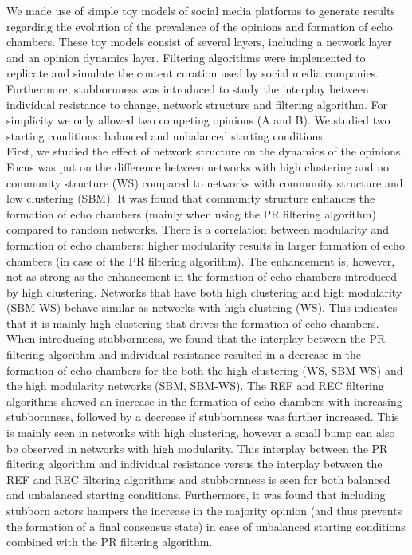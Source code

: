 \documentclass[11 pt , letterpaper , twoside , openright]{book}
\begin{document}
We made use of simple toy models of social media platforms to generate results regarding the evolution of the prevalence of the opinions and formation of echo chambers. These toy models consist of several layers, including a network layer and an opinion dynamics layer. Filtering algorithms were implemented to replicate and simulate the content curation used by social media companies. Furthermore, stubbornness was introduced to study the interplay between individual resistance to change, network structure and filtering algorithm. For simplicity we only allowed two competing opinions (A and B). We studied two starting conditions: balanced and unbalanced starting conditions.\\
\newline
First, we studied the effect of network structure on the dynamics of the opinions. Focus was put on the difference between networks with high clustering and no community structure (WS) compared to networks with community structure and low clustering (SBM). It was found that community structure enhances the formation of echo chambers (mainly when using the PR filtering algorithm) compared to random networks. There is a correlation between modularity and formation of echo chambers: higher modularity results in larger formation of echo chambers (in case of the PR filtering algorithm). The enhancement is, however, not as strong as the enhancement in the formation of echo chambers introduced by high clustering. Networks that have both high clustering and high modularity (SBM-WS) behave similar as networks with high clusteing (WS). This indicates that it is mainly high clustering that drives the formation of echo chambers.\\
\newline
When introducing stubbornness, we found that the interplay between the PR filtering algorithm and individual resistance resulted in a decrease in the formation of echo chambers for the both the high clustering (WS, SBM-WS) and the high modularity networks (SBM, SBM-WS). The REF and REC filtering algorithms showed an increase in the formation of echo chambers with increasing stubbornness, followed by a decrease if stubbornness was further increased. This is mainly seen in networks with high clustering, however a small bump can also be observed in networks with high modularity. This interplay between the PR filtering algorithm and individual resistance versus the interplay between the REF and REC filtering algorithms and stubbornness is seen for both balanced and unbalanced starting conditions. Furthermore, it was found that including stubborn actors hampers the increase in the majority opinion (and thus prevents the formation of a final consensus state) in case of unbalanced starting conditions combined with the PR filtering algorithm.\\
\end{document}
